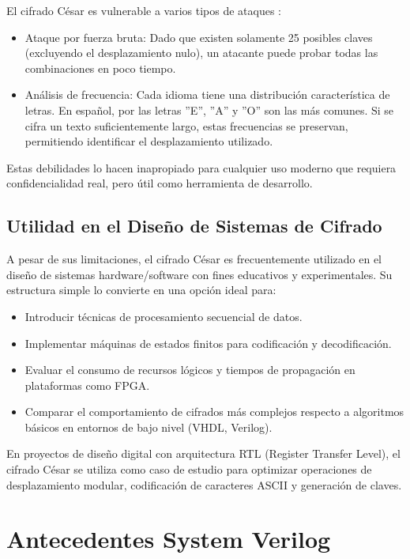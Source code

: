El cifrado César es vulnerable a varios tipos de ataques :

\begin{itemize}
\item Ataque por fuerza bruta: Dado que existen solamente 25 posibles claves (excluyendo el desplazamiento nulo), un atacante puede probar todas las combinaciones en poco tiempo.
\item Análisis de frecuencia: Cada idioma tiene una distribución característica de letras. En español, por   las letras ''E'', ''A'' y ''O'' son las más comunes. Si se cifra un texto suficientemente largo, estas frecuencias se preservan, permitiendo identificar el desplazamiento utilizado.
\end{itemize}

Estas debilidades lo hacen inapropiado para cualquier uso moderno que requiera confidencialidad real, pero útil como herramienta de desarrollo.

\section{Utilidad en el Diseño de Sistemas de Cifrado}
A pesar de sus limitaciones, el cifrado César es frecuentemente utilizado en el diseño de sistemas hardware/software con fines educativos y experimentales. Su estructura simple lo convierte en una opción ideal para:

\begin{itemize}
\item Introducir técnicas de procesamiento secuencial de datos.
\item Implementar máquinas de estados finitos para codificación y decodificación.
\item Evaluar el consumo de recursos lógicos y tiempos de propagación en plataformas como FPGA.
\item Comparar el comportamiento de cifrados más complejos respecto a algoritmos básicos en entornos de bajo nivel (VHDL, Verilog).
\end{itemize}

En proyectos de diseño digital con arquitectura RTL (Register Transfer Level), el cifrado César se utiliza como caso de estudio para optimizar operaciones de desplazamiento modular, codificación de caracteres ASCII y generación de claves.



\chapter{Antecedentes System Verilog}

